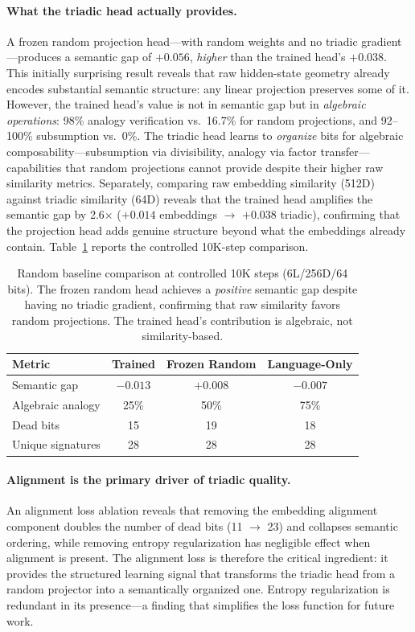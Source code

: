 \documentclass[11pt,a4paper]{article}
\begin{document}
\paragraph{What the triadic head actually provides.}
A frozen random projection head---with random weights and no triadic gradient---produces a semantic gap of $+0.056$, \emph{higher} than the trained head's $+0.038$. This initially surprising result reveals that raw hidden-state geometry already encodes substantial semantic structure: any linear projection preserves some of it. However, the trained head's value is not in semantic gap but in \emph{algebraic operations}: 98\% analogy verification vs.\ 16.7\% for random projections, and 92--100\% subsumption vs.\ 0\%. The triadic head learns to \emph{organize} bits for algebraic composability---subsumption via divisibility, analogy via factor transfer---capabilities that random projections cannot provide despite their higher raw similarity metrics. Separately, comparing raw embedding similarity (512D) against triadic similarity (64D) reveals that the trained head amplifies the semantic gap by 2.6$\times$ ($+0.014$ embeddings $\rightarrow$ $+0.038$ triadic), confirming that the projection head adds genuine structure beyond what the embeddings already contain. Table~\ref{tab:random-baseline} reports the controlled 10K-step comparison.

\begin{table}[h]
\centering
\caption{Random baseline comparison at controlled 10K steps (6L/256D/64 bits). The frozen random head achieves a \emph{positive} semantic gap despite having no triadic gradient, confirming that raw similarity favors random projections. The trained head's contribution is algebraic, not similarity-based.}
\label{tab:random-baseline}
\small
\begin{tabular}{lccc}
\toprule
\textbf{Metric} & \textbf{Trained} & \textbf{Frozen Random} & \textbf{Language-Only} \\
\midrule
Semantic gap       & $-0.013$  & $+0.008$  & $-0.007$ \\
Algebraic analogy  & 25\%      & 50\%      & 75\%     \\
Dead bits          & 15        & 19        & 18       \\
Unique signatures  & 28        & 28        & 28       \\
\bottomrule
\end{tabular}
\end{table}

\paragraph{Alignment is the primary driver of triadic quality.}
An alignment loss ablation reveals that removing the embedding alignment component doubles the number of dead bits (11 $\rightarrow$ 23) and collapses semantic ordering, while removing entropy regularization has negligible effect when alignment is present. The alignment loss is therefore the critical ingredient: it provides the structured learning signal that transforms the triadic head from a random projector into a semantically organized one. Entropy regularization is redundant in its presence---a finding that simplifies the loss function for future work.
\end{document}
